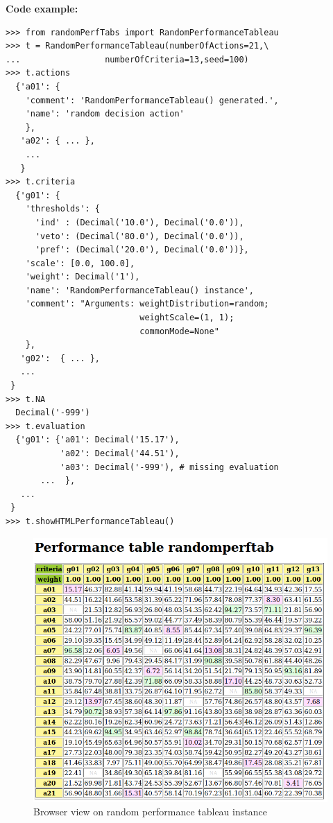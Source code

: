 \noindent \textbf{Code example:}
\begin{lstlisting}[caption={Generating a random performance tableau},label=list:6.1]
>>> from randomPerfTabs import RandomPerformanceTableau
>>> t = RandomPerformanceTableau(numberOfActions=21,\
...                 numberOfCriteria=13,seed=100)
>>> t.actions
  {'a01': {
    'comment': 'RandomPerformanceTableau() generated.',
    'name': 'random decision action'
    },
   'a02': { ... },
    ...
   }
>>> t.criteria
  {'g01': {
    'thresholds': {
      'ind' : (Decimal('10.0'), Decimal('0.0')),
      'veto': (Decimal('80.0'), Decimal('0.0')),
      'pref': (Decimal('20.0'), Decimal('0.0'))},
    'scale': [0.0, 100.0],
    'weight': Decimal('1'),
    'name': 'RandomPerformanceTableau() instance',
    'comment': "Arguments: weightDistribution=random;
                           weightScale=(1, 1);
                           commonMode=None"
    },
   'g02':  { ... },
   ...
 }
>>> t.NA
  Decimal('-999')
>>> t.evaluation
  {'g01': {'a01': Decimal('15.17'),
           'a02': Decimal('44.51'),
           'a03': Decimal('-999'), # missing evaluation
       ...  },
   ...
 }
>>> t.showHTMLPerformanceTableau()
\end{lstlisting}
\begin{figure}[ht]
\includegraphics[width=\hsize]{Figures/6-1-randomPerfTab1.png}
\caption{Browser view on random performance tableau instance}
\label{fig:6.1}       %
\end{figure}

